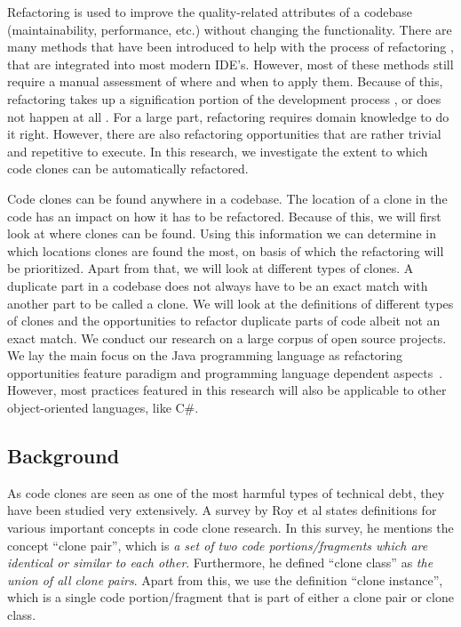 \documentclass[a4paper]{article}
\begin{document}
Refactoring is used to improve the quality-related attributes of a codebase (maintainability, performance, etc.) without changing the functionality. There are many methods that have been introduced to help with the process of refactoring \cite{fowler1999refactoring, wake2004refactoring}, that are integrated into most modern IDE's. However, most of these methods still require a manual assessment of where and when to apply them. Because of this, refactoring takes up a signification portion of the development process \cite{lientz1978characteristics, mens2004survey}, or does not happen at all \cite{mens2003refactoring}. For a large part, refactoring requires domain knowledge to do it right. However, there are also refactoring opportunities that are rather trivial and repetitive to execute. In this research, we investigate the extent to which code clones can be automatically refactored.

Code clones can be found anywhere in a codebase. The location of a clone in the code has an impact on how it has to be refactored. Because of this, we will first look at where clones can be found. Using this information we can determine in which locations clones are found the most, on basis of which the refactoring will be prioritized. Apart from that, we will look at different  types of clones. A duplicate part in a codebase does not always have to be an exact match with another part to be called a clone. We will look at the definitions of different types of clones and the opportunities to refactor duplicate parts of code albeit not an exact match. We conduct our research on a large corpus of open source projects. We lay the main focus on the Java programming language as refactoring opportunities feature paradigm and programming language dependent aspects~\cite{choi2011extracting}. However, most practices featured in this research will also be applicable to other object-oriented languages, like C\#.

\subsection{Background}
As code clones are seen as one of the most harmful types of technical debt, they have been studied very extensively. A survey by Roy et al \cite{roy2007survey} states definitions for various important concepts in code clone research. In this survey, he mentions the concept ``clone pair'', which is \textit{a set of two code portions/fragments which are identical or similar to each other}. Furthermore, he defined ``clone class'' as \textit{the union of all clone pairs}. Apart from this, we use the definition ``clone instance'', which is a single code portion/fragment that is part of either a clone pair or clone class.
\end{document}
